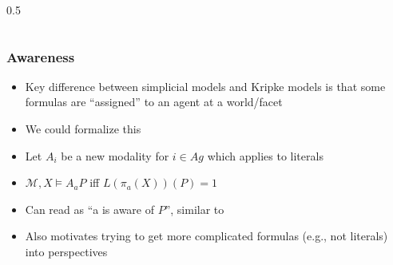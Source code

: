 \documentclass{beamer}
\newcommand{\M}{\mathcal{M}}
\begin{document}
\begin{frame}[fragile]
\begin{columns}
\begin{column}{0.5\textwidth}
\begin{center}
			\end{center}
		\end{column}
	\end{columns}
	
	
	
\end{frame}

\begin{frame}[fragile]
	\frametitle{Awareness}
	\begin{itemize}
		\item Key difference between simplicial models and Kripke models is that some formulas are ``assigned'' to an agent at a world/facet
		\item We could formalize this
		\item Let $A_i$ be a new modality for $i\in Ag$ which applies to literals
		\item $\M,X\vDash A_a P$ iff $L(\pi_a(X))(P)=1$
		\item Can read as ``a is aware of $P$'', similar to \cite{Awareness}
		\item Also motivates trying to get more complicated formulas (e.g., not literals) into perspectives
	\end{itemize}
	
\end{frame}
\end{document}
